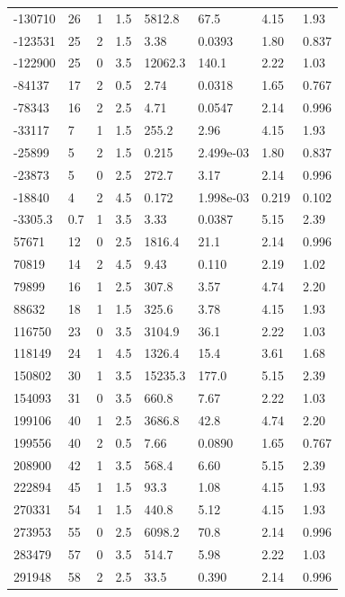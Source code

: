 \documentclass[preview]{standalone}
\begin{document}
{{\begin{tabular}{L{1.2cm}C{1.2cm} C{0.3cm}C{0.5cm} C{1.4cm}C{1.4cm} C{1.4cm}C{1.4cm}}
  -130710  &    26  & 1     & 1.5 &  5812.8  & 67.5  & 4.15 &  1.93   \\ 
  -123531  &    25  & 2     & 1.5 &  3.38  & 0.0393  & 1.80 &  0.837   \\ 
  -122900  &    25  & 0     & 3.5 &  12062.3  & 140.1  & 2.22 &  1.03   \\ 
  -84137  &    17  & 2     & 0.5 &  2.74  & 0.0318  & 1.65 &  0.767   \\ 
  -78343  &    16  & 2     & 2.5 &  4.71  & 0.0547  & 2.14 &  0.996   \\ 
  -33117  &     7  & 1     & 1.5 &  255.2  & 2.96  & 4.15 &  1.93   \\ 
  -25899  &     5  & 2     & 1.5 &  0.215  & 2.499e-03  & 1.80 &  0.837   \\ 
  -23873  &     5  & 0     & 2.5 &  272.7  & 3.17  & 2.14 &  0.996   \\ 
  -18840  &     4  & 2     & 4.5 &  0.172  & 1.998e-03  & 0.219 &  0.102   \\ 
  -3305.3  &   0.7  & 1     & 3.5 &  3.33  & 0.0387  & 5.15 &  2.39   \\ 
  57671  &    12  & 0     & 2.5 &  1816.4  & 21.1  & 2.14 &  0.996   \\ 
  70819  &    14  & 2     & 4.5 &  9.43  & 0.110  & 2.19 &  1.02   \\ 
  79899  &    16  & 1     & 2.5 &  307.8  & 3.57  & 4.74 &  2.20   \\ 
  88632  &    18  & 1     & 1.5 &  325.6  & 3.78  & 4.15 &  1.93   \\ 
  116750  &    23  & 0     & 3.5 &  3104.9  & 36.1  & 2.22 &  1.03   \\ 
  118149  &    24  & 1     & 4.5 &  1326.4  & 15.4  & 3.61 &  1.68   \\ 
  150802  &    30  & 1     & 3.5 &  15235.3  & 177.0  & 5.15 &  2.39   \\ 
  154093  &    31  & 0     & 3.5 &  660.8  & 7.67  & 2.22 &  1.03   \\ 
  199106  &    40  & 1     & 2.5 &  3686.8  & 42.8  & 4.74 &  2.20   \\ 
  199556  &    40  & 2     & 0.5 &  7.66  & 0.0890  & 1.65 &  0.767   \\ 
  208900  &    42  & 1     & 3.5 &  568.4  & 6.60  & 5.15 &  2.39   \\ 
  222894  &    45  & 1     & 1.5 &  93.3  & 1.08  & 4.15 &  1.93   \\ 
  270331  &    54  & 1     & 1.5 &  440.8  & 5.12  & 4.15 &  1.93   \\ 
  273953  &    55  & 0     & 2.5 &  6098.2  & 70.8  & 2.14 &  0.996   \\ 
  283479  &    57  & 0     & 3.5 &  514.7  & 5.98  & 2.22 &  1.03   \\ 
  291948  &    58  & 2     & 2.5 &  33.5  & 0.390  & 2.14 &  0.996   \\ 
\hline 
\end{tabular} 

}}
\end{document}
